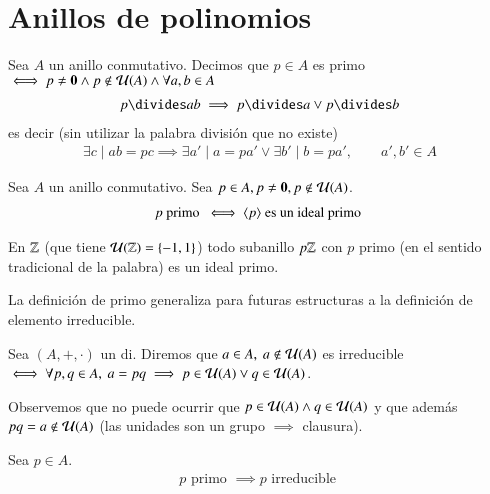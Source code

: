 
\chapter{Anillos de polinomios}


\begin{dfn}[Primo] %
	Sea $A$ un anillo conmutativo. Decimos que $p \in A$ es primo $\iff p \neq \mathbf{0} \land p \notin \mathcal{U}(A) \land \forall a,b \in A$
	\begin{align*}
	p \divides ab \implies p \divides a \lor p \divides b
	\end{align*}
	es decir (sin utilizar la palabra división que no existe)
	\begin{align*}
		\exists c \mid ab = pc \implies \exists a' \mid a = pa' \lor \exists b' \mid b = pa',\qquad a',b' \in A
	\end{align*}
\end{dfn}

\begin{pro}
	Sea $A$ un anillo conmutativo. Sea $p \in A, p \neq \mathbf{0}, p \notin \mathcal{U}(A)$.
	\begin{align*}
		p \text{ primo } \iff \langle p\rangle \text{ es un ideal primo }
	\end{align*}
\end{pro}

\begin{ej}
	En $\mathbb{Z}$ (que tiene $\mathcal{U}(\mathbb{Z}) = \{-1, 1\}$) todo subanillo $p\mathbb{Z}$ con $p$ primo (en el sentido tradicional de la palabra) es un ideal primo.
\end{ej}

La definición de primo generaliza para futuras estructuras a la definición de elemento irreducible.

\begin{dfn}
	Sea $(A, +, \cdot)$ un \gls{di}. Diremos que $a \in A,\ a \notin \mathcal{U}(A)$ es irreducible $\iff \forall p,q \in A,\ a = pq\implies p \in \mathcal{U}(A) \lor q \in \mathcal{U}(A)$.
\end{dfn}

Observemos que no puede ocurrir que $p \in \mathcal{U}(A) \land q \in \mathcal{U}(A)$ y que además $pq = a \notin \mathcal{U}(A)$ (las unidades son un grupo $\implies$ clausura).

\begin{pro}
	Sea $p \in A$.
	\begin{align*}
		p \text{ primo } \implies p \text{ irreducible }
	\end{align*}
\end{pro}


